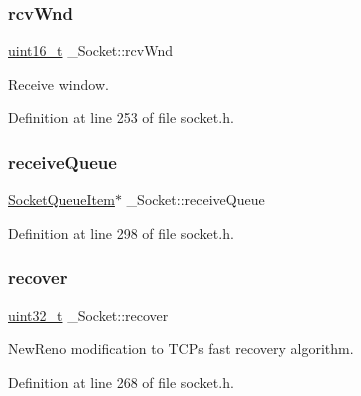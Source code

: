\mbox{\label{struct__Socket_a182223789152b47064aa6acc44dac609}} 
\subsubsection{\texorpdfstring{rcv\+Wnd}{rcvWnd}}
{\footnotesize\ttfamily \hyperlink{stdint_8h_a273cf69d639a59973b6019625df33e30}{uint16\+\_\+t} \+\_\+\+Socket\+::rcv\+Wnd}



Receive window. 



Definition at line 253 of file socket.\+h.

\mbox{\label{struct__Socket_aa8f1661b715d180d8757600a4e9f6560}} 
\subsubsection{\texorpdfstring{receive\+Queue}{receiveQueue}}
{\footnotesize\ttfamily \hyperlink{socket_8h_a3de9721a15d5f4c878df4e2dfccc078f}{Socket\+Queue\+Item}$\ast$ \+\_\+\+Socket\+::receive\+Queue}



Definition at line 298 of file socket.\+h.

\mbox{\label{struct__Socket_aa15e14d2e198b45eeeb9887d39e5bfb2}} 
\subsubsection{\texorpdfstring{recover}{recover}}
{\footnotesize\ttfamily \hyperlink{stdint_8h_a435d1572bf3f880d55459d9805097f62}{uint32\+\_\+t} \+\_\+\+Socket\+::recover}



New\+Reno modification to T\+CP\textquotesingle{}s fast recovery algorithm. 



Definition at line 268 of file socket.\+h.

\mbox{\label{struct__Socket_a0d26438ef8e64afc1253df250a9745b7}} 
